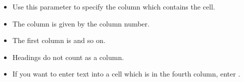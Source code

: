 \begin{itemize}
\item Use this parameter to specify the column which contains the cell.
\item The column is given by the column number.
\item The first column is  and so on.
\item Headings do not count as a column.
\item If you want to enter text into a cell which is in the fourth column, enter . 
\end{itemize}
